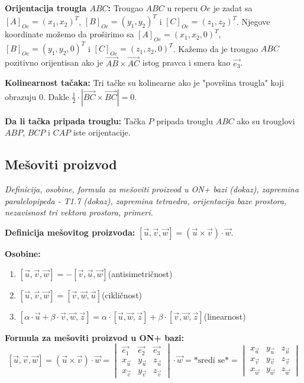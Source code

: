 \documentclass[12pt]{article}
\newcommand{\vek}[1]{\overrightarrow{#1}}
\begin{document}
\textbf{Orijentacija trougla $ABC$:} Trougao $ABC$ u reperu $Oe$ je zadat sa
$[A]_{Oe}=(x_1,x_2)^T$, $[B]_{Oe}=(y_1,y_2)^T$ i $[C]_{Oe}=(z_1,z_2)^T$.
Njegove koordinate možemo da proširimo sa
$[A]_{Oe}=(x_1,x_2,0)^T$, $[B]_{Oe}=(y_1,y_2,0)^T$ i $[C]_{Oe}=(z_1,z_2,0)^T$.
Kažemo da je trougao $ABC$ pozitivno orijentisan ako je
$\vek{AB}\times\vek{AC}$ istog pravca i smera kao $\vek{e_3}$.
\par

\textbf{Kolinearnost tačaka:} Tri tačke su kolinearne ako je "površina trougla"
koji obrazuju $0$. Dakle $\frac{1}{2}\cdot |\vek{BC}\times\vek{BC}|=0$.
\par

\textbf{Da li tačka pripada trouglu:} Tačka $P$ pripada trouglu $ABC$ ako su
trouglovi $ABP$, $BCP$ i $CAP$ iste orijentacije.

\subsection{Mešoviti proizvod}
\textit{Definicija, osobine, formula za mešoviti proizvod u ON+ bazi (dokaz),
    zapremina paralelopipeda - T1.7 (dokaz), zapremina tetraedra, orijentacija baze
    prostora, nezavisnost tri vektora prostora, primeri.}
\par
\vspace*{1cm}

\textbf{Definicija mešovitog proizvoda:} $[\vek{u},\vek{v},\vek{w}]=
    (\vek{u}\times\vek{v})\cdot\vek{w}$.
\par

\textbf{Osobine:}
\begin{enumerate}[label=\textit{\arabic*)}]
    \item $[\vek{u},\vek{v},\vek{w}]=-[\vek{v},\vek{u},\vek{w}]$\hspace*{1cm}(antisimetričnost)
    \item $[\vek{u},\vek{v},\vek{w}]=[\vek{v},\vek{w},\vek{u}]$\hspace*{1cm}(cikličnost)
    \item $[\alpha\cdot\vek{u}+\beta\cdot\vek{v},\vek{w},\vek{z}]=\alpha\cdot[\vek{u},\vek{w},\vek{z}]+\beta\cdot[\vek{v},\vek{w},\vek{z}]$\hspace*{1cm}(linearnost)
\end{enumerate}
\par

\textbf{Formula za mešoviti proizvod u ON+ bazi:}
$$[\vek{u},\vek{v},\vek{w}]=(\vek{u}\times\vek{v})\cdot\vek{w}= \begin{vmatrix}
        \vek{e_1}   & \vek{e_2}   & \vek{e_3}   \\
        x_{\vek{u}} & y_{\vek{u}} & z_{\vek{u}} \\
        x_{\vek{v}} & y_{\vek{v}} & z_{\vek{v}}
    \end{vmatrix}\cdot\vek{w}=\text{*sredi se*}= \begin{vmatrix}
        x_{\vek{u}} & y_{\vek{u}} & z_{\vek{u}} \\
        x_{\vek{v}} & y_{\vek{v}} & z_{\vek{v}} \\
        x_{\vek{w}} & y_{\vek{w}} & z_{\vek{w}}
    \end{vmatrix}$$
\par
\end{document}
